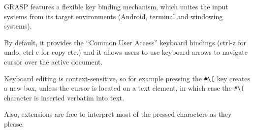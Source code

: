 \documentclass[sigconf]{acmart}
\begin{document}
GRASP features a flexible key binding mechanism,
which unites the input systems from its target
environments (Android, terminal and windowing
systems).

By default, it provides the ``Common User Access''
keyboard bindings (ctrl-z for undo, ctrl-c for copy
etc.) and it allows users to use keyboard arrows to
navigate cursor over the active document.

Keyboard editing is context-sensitive, so
for example pressing the \texttt{\#\textbackslash[}
key creates a new box, unless the cursor is located on a text element,
in which case the \texttt{\#\textbackslash[} character is inserted verbatim
into text.

Also, extensions are free to interpret
most of the pressed characters as they please.








\end{document}
